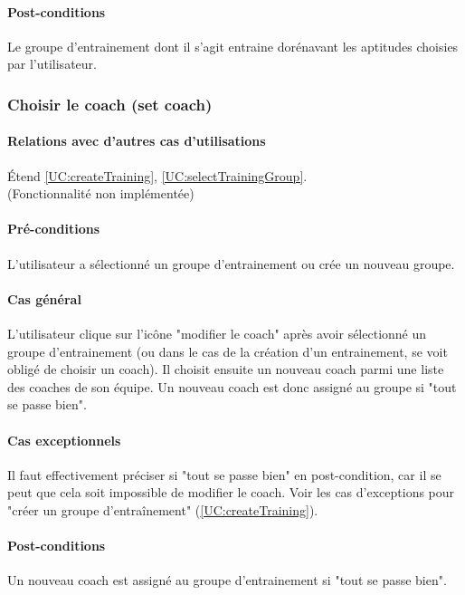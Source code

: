 \paragraph{Post-conditions}
\begin{list}{}{\leftmargin=1.5em}
\item{Le groupe d'entrainement dont il s'agit entraine dorénavant les aptitudes choisies par l'utilisateur.}
\end{list}

\subsubsection{Choisir le coach (set coach)}
\label{UC:chooseTrainingCoach}
\paragraph{Relations avec d'autres cas d'utilisations}
Étend \ref{UC:createTraining}, \ref{UC:selectTrainingGroup}.
\\(Fonctionnalité non implémentée)
\paragraph{Pré-conditions}
\begin{list}{}{\leftmargin=1.5em}
\item{L'utilisateur a sélectionné un groupe d'entrainement ou crée un nouveau groupe.}
\end{list}
\paragraph{Cas général}
L'utilisateur clique sur l'icône "modifier le coach" après avoir sélectionné un groupe d'entrainement (ou dans le cas de la création d'un entrainement, se voit obligé de choisir un coach). Il choisit ensuite un nouveau coach parmi une liste des coaches de son équipe. Un nouveau coach est donc assigné au groupe si "tout se passe bien".
\paragraph{Cas exceptionnels}
Il faut effectivement préciser si "tout se passe bien" en post-condition, car il se peut que cela soit impossible de modifier le coach. Voir les cas d'exceptions pour "créer un groupe d'entraînement" (\ref{UC:createTraining}).
\paragraph{Post-conditions}
\begin{list}{}{\leftmargin=1.5em}
\item{Un nouveau coach est assigné au groupe d'entrainement si "tout se passe bien".}
\end{list}

